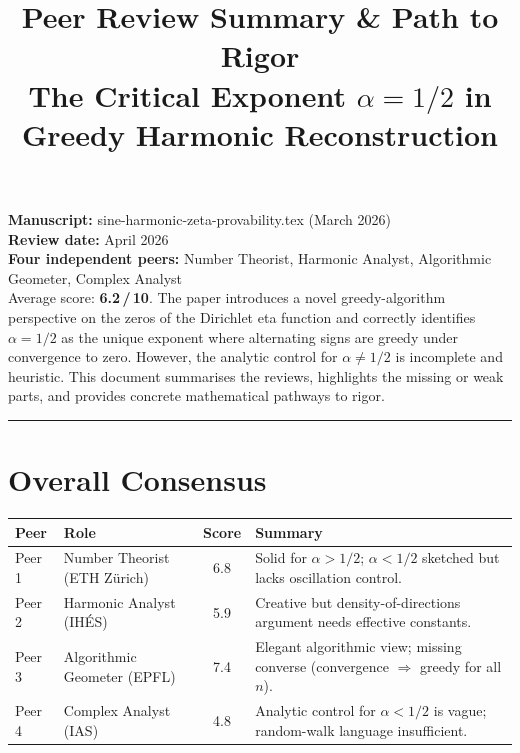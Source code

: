 \documentclass[11pt,a4paper]{article}
\title{Peer Review Summary \& Path to Rigor\\[6pt]
\large The Critical Exponent $\alpha = 1/2$ in Greedy Harmonic Reconstruction}
\author{}
\date{}
\begin{document}
\maketitle

\begin{tcolorbox}[colback=abstractbg, colframe=accent, leftrule=4pt, rightrule=0pt, toprule=0pt, bottomrule=0pt, boxsep=5pt, arc=0pt]
\textbf{Manuscript:} sine-harmonic-zeta-provability.tex (March 2026)\\
\textbf{Review date:} April 2026\\
\textbf{Four independent peers:} Number Theorist, Harmonic Analyst, Algorithmic Geometer, Complex Analyst\\[6pt]
Average score: \textbf{6.2\,/\,10}. The paper introduces a novel greedy-algorithm perspective on the zeros of the Dirichlet eta function and correctly identifies $\alpha = 1/2$ as the unique exponent where alternating signs are greedy under convergence to zero. However, the analytic control for $\alpha \neq 1/2$ is incomplete and heuristic. This document summarises the reviews, highlights the missing or weak parts, and provides concrete mathematical pathways to rigor.
\end{tcolorbox}

\bigskip\hrule\bigskip

\section{Overall Consensus}

\begin{table}[h]
\centering
\begin{tabular}{@{}llcl@{}}
\toprule
\textbf{Peer} & \textbf{Role} & \textbf{Score} & \textbf{Summary} \\
\midrule
Peer 1 & Number Theorist (ETH Z\"urich) & 6.8 & Solid for $\alpha > 1/2$; $\alpha < 1/2$ sketched but lacks oscillation control. \\
Peer 2 & Harmonic Analyst (IH\'ES) & 5.9 & Creative but density-of-directions argument needs effective constants. \\
Peer 3 & Algorithmic Geometer (EPFL) & 7.4 & Elegant algorithmic view; missing converse (convergence $\Rightarrow$ greedy for all $n$). \\
Peer 4 & Complex Analyst (IAS) & 4.8 & Analytic control for $\alpha < 1/2$ is vague; random-walk language insufficient. \\
\bottomrule
\end{tabular}
\end{table}
\end{document}
